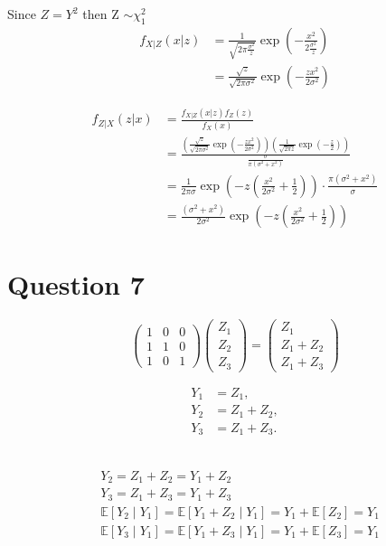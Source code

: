 \documentclass{article}
\begin{document}
Since $Z= Y^2$ then Z $\sim \chi^2_1$
\begin{align*}
f_{X|Z}(x|z) &= \frac{1}{\sqrt{2 \pi \frac{\sigma^2}{z}}} \exp\left(-\frac{x^2}{2 \frac{\sigma^2}{z}}\right) \\
&= \frac{\sqrt{z}}{\sqrt{2 \pi \sigma^2}} \exp\left(-\frac{z x^2}{2 \sigma^2}\right)
\end{align*}

\begin{align*}
f_{Z|X}(z|x) &= \frac{f_{X|Z}(x|z) f_Z(z)}{f_X(x)} \\
&= \frac{\left(\frac{\sqrt{z}}{\sqrt{2 \pi \sigma^2}} \exp\left(-\frac{z x^2}{2 \sigma^2}\right)\right) \left(\frac{1}{\sqrt{2\pi z}} \exp\left(-\frac{z}{2}\right)\right)}{\frac{\sigma}{\pi (\sigma^2 + x^2)}} \\
&= \frac{1}{2 \pi \sigma} \exp\left(-z \left(\frac{x^2}{2 \sigma^2} + \frac{1}{2}\right)\right) \cdot \frac{\pi (\sigma^2 + x^2)}{\sigma} \\
&= \frac{(\sigma^2 + x^2)}{2 \sigma^2} \exp\left(-z \left(\frac{x^2}{2 \sigma^2} + \frac{1}{2}\right)\right)
\end{align*}


\section*{Question 7}
\[
\begin{pmatrix}
1 & 0 & 0 \\
1 & 1 & 0 \\
1 & 0 & 1
\end{pmatrix}
\begin{pmatrix}
Z_1 \\
Z_2 \\
Z_3
\end{pmatrix}
= \begin{pmatrix}
    Z_1 \\
    Z_1+Z_2\\
    Z_1+Z_3
\end{pmatrix}
\]

\[
\begin{aligned}
Y_1 &= Z_1, \\
Y_2 &= Z_1 + Z_2, \\
Y_3 &= Z_1 + Z_3.
\end{aligned}
\]
\

\begin{align*}
&Y_2 = Z_1 + Z_2 = Y_1 + Z_2 \\
&Y_3 = Z_1 + Z_3 = Y_1 + Z_3 \\
&\mathbb{E}[Y_2 \mid Y_1] = \mathbb{E}[Y_1 + Z_2 \mid Y_1] = Y_1 + \mathbb{E}[Z_2] = Y_1 \\
&\mathbb{E}[Y_3 \mid Y_1] = \mathbb{E}[Y_1 + Z_3 \mid Y_1] = Y_1 + \mathbb{E}[Z_3] = Y_1 \\
\end{align*}
\end{document}

